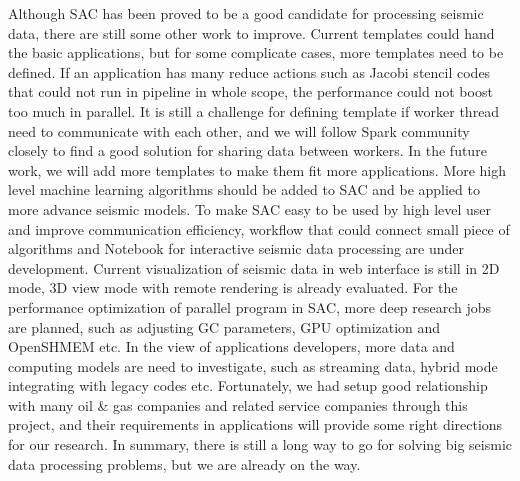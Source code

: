 Although SAC has been proved to be a good candidate for processing seismic data, there are still some other work to improve. Current templates could hand the basic applications, but for some complicate cases, more templates need to be defined. If an application has many reduce actions such as Jacobi stencil codes that could not run in pipeline in whole scope, the performance could not boost too much in parallel. It is still a challenge for defining template if worker thread need to communicate with each other, and we will follow Spark community closely to find a good solution for sharing data between workers. In the future work, we will add more templates to make them fit more applications. More high level machine learning algorithms should be added to SAC and be applied to more advance seismic models. To make SAC easy to be used by high level user and improve communication efficiency, workflow that could connect small piece of algorithms and Notebook for interactive seismic data processing are under development. Current visualization of seismic data in web interface is still in 2D mode, 3D view mode with remote rendering is already evaluated. For the performance optimization of parallel program in SAC, more deep research jobs are planned, such as adjusting GC parameters, GPU optimization and OpenSHMEM etc. In the view of applications developers, more data and computing models are need to investigate, such as streaming data, hybrid mode integrating with legacy codes etc. Fortunately, we had setup good relationship with many oil \& gas companies and related service companies through this project, and their requirements in applications will provide some right directions for our research. In summary, there is still a long way to go for solving big seismic data processing problems, but we are already on the way. 




